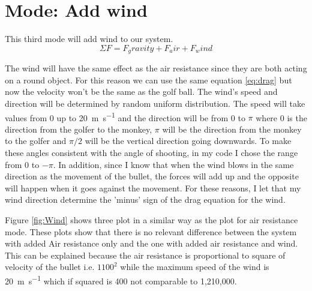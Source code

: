 
\section*{Mode: Add wind}

This third mode will add wind to our system. 
\begin{equation*}
    \Sigma F = F_gravity + F_air + F_wind
\end{equation*}

The wind will have the same effect as the air resistance since they are both acting on a round object. For this reason we can use the same equation \ref{eq:drag} but now the velocity won't be the same as the golf ball. The wind's speed and direction will be determined by random uniform distribution. The speed will take values from 0 up to \SI{20}{\m\per\second} and the direction will be from 0 to $\pi$ where 0 is the direction from the golfer to the monkey, $\pi$ will be the direction from the monkey to the golfer and $\pi/2$ will be the vertical direction going downwards. To make these angles consistent with the angle of shooting, in my code I chose the range from 0 to $-\pi$. In addition, since I know that when the wind blows in the same direction as the movement of the bullet, the forces will add up and the opposite will happen when it goes against the movement. For these reasons, I let that my wind direction determine the 'minus' sign of the drag equation for the wind.

Figure \ref{fig:Wind} shows three plot in a similar way as the plot for air resistance mode. These plots show that there is no relevant difference between the system with added Air resistance only and the one with added air resistance and wind. This can be explained because the air resistance is proportional to square of velocity of the bullet i.e. $1100^2$ while the maximum speed of the wind is \SI{20}{\meter\per\second} which if squared is 400 not comparable to 1,210,000. 

